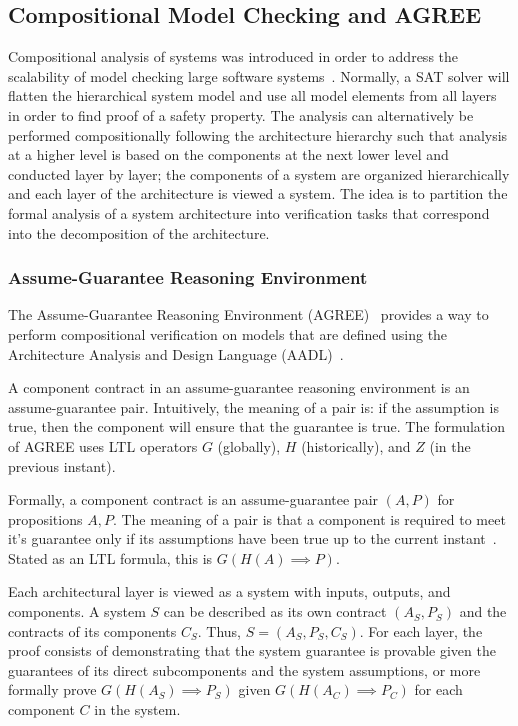 \subsection{Compositional Model Checking and AGREE}
\label{compModelChecking}
Compositional analysis of systems was introduced in order to address the scalability of model checking large software systems~\cite{pnueli1985transition, heckel1998compositional, NFM2012:CoGaMiWhLaLu}. Normally, a SAT solver will flatten the hierarchical system model and use all model elements from all layers in order to find proof of a safety property. The analysis can alternatively be performed compositionally following the architecture hierarchy such that analysis at a higher level is based on the components at the next lower level and conducted layer by layer; the components of a system are organized hierarchically and each layer of the architecture is viewed a system. The idea is to partition the formal analysis of a system architecture into verification tasks that correspond into the decomposition of the architecture. 

\subsubsection{Assume-Guarantee Reasoning Environment}
The Assume-Guarantee Reasoning Environment (AGREE)~\cite{cofer2012compositional} provides a way to perform compositional verification on models that are defined using the Architecture Analysis and Design Language (AADL)~\cite{aerospace2012sae}. 

A component contract in an assume-guarantee reasoning environment is an assume-guarantee pair. Intuitively, the meaning of a pair is: if the assumption is true, then the component will ensure that the guarantee is true. The formulation of AGREE uses LTL operators $G$ (globally), $H$ (historically), and $Z$ (in the previous instant).

Formally, a component contract is an assume-guarantee pair $(A,P)$ for propositions $A, P$. The meaning of a pair is that a component is required to meet it's guarantee only if its assumptions have been true up to the current instant~\cite{cofer2012compositional}. Stated as an LTL formula, this is $G(H(A) \implies P)$. 

Each architectural layer is viewed as a system with inputs, outputs, and components. A system $S$ can be described as its own contract $(A_S, P_S)$ and the contracts of its components $C_S$. Thus, $S = (A_S, P_S, C_S)$. For each layer, the proof consists of demonstrating that the system guarantee is provable given the guarantees of its direct subcomponents and the system assumptions, or more formally prove $G(H(A_S) \implies P_S)$ given $G(H(A_C) \implies P_C)$ for each component $C$ in the system.  

